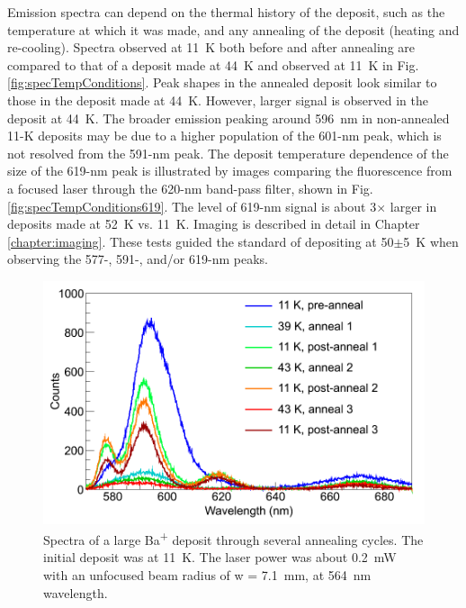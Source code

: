 Emission spectra can depend on the thermal history of the deposit, such as the temperature at which it was made, and any annealing of the deposit (heating and re-cooling).  Spectra observed at 11~K both before and after annealing are compared to that of a deposit  made at 44~K and observed at 11~K in Fig. \ref{fig:specTempConditions}.  Peak shapes in the annealed deposit look similar to those in the deposit made at 44~K.  However, larger signal is observed in the deposit at 44~K.  The broader emission peaking around 596~nm in non-annealed 11-K deposits may be due to a higher population of the 601-nm peak, which is not resolved from the 591-nm peak.  The deposit temperature dependence of the size of the 619-nm peak is illustrated by images comparing the fluorescence from a focused laser through the 620-nm band-pass filter, shown in Fig. \ref{fig:specTempConditions619}.  The level of 619-nm signal is about 3$\times$ larger in deposits made at 52~K vs. 11~K.  Imaging is described in detail in Chapter \ref{chapter:imaging}.  These tests guided the standard of depositing at 50$\pm$5~K when observing the 577-, 591-, and/or 619-nm peaks.







\begin{figure} %
        \centering
                \includegraphics[width=.7\textwidth]{figures/spectra_annealing.png}
                \caption{Spectra of a large Ba\textsuperscript{+} deposit through several annealing cycles.  The initial deposit was at 11~K.  The laser power was about 0.2~mW with an unfocused beam radius of w = 7.1~mm, at 564~nm wavelength.  \cite{Mong2015}}
\label{fig:specAnneal}
\end{figure}

